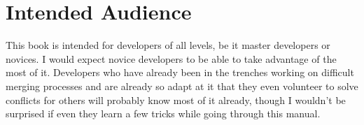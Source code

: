 
\section{Intended Audience}

This book is intended for developers of all levels, be it master developers or novices. I would expect novice developers to be able to take advantage of the most of it. Developers who have already been in the trenches working on difficult merging processes and are already so adapt at it that they even volunteer to solve conflicts for others will probably know most of it already, though I wouldn't be surprised if even they learn a few tricks while going through this manual.
